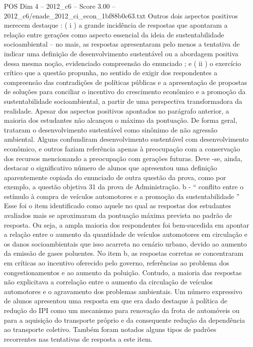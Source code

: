 \begin{textsample}{POS Dim 4 – 2012\_c6 – Score 3.00 – 2012\_c6/enade\_2012\_ci\_econ\_1bf88b0c63.txt}
Outros dois aspectos positivos merecem destaque : ( i ) a grande incidência de respostas que apontaram a relação entre gerações como aspecto essencial da ideia de sustentabilidade socioambiental – no mais, as respostas apresentaram pelo menos a tentativa de indicar uma definição de desenvolvimento sustentável ou a abordagem positiva dessa mesma noção, evidenciado compreensão do enunciado ; e ( ii ) o exercício crítico que a questão propunha, no sentido de exigir dos respondentes a compreensão das contradições de políticas públicas e a apresentação de propostas de soluções para conciliar o incentivo do crescimento econômico e a promoção da sustentabilidade socioambiental, a partir de uma perspectiva transformadora da realidade.
Apesar dos aspectos positivos apontados no parágrafo anterior, a maioria dos estudantes não alcançou o máximo da pontuação.
De forma geral, trataram o desenvolvimento sustentável como sinônimo de não agressão ambiental.
Alguns confundiram desenvolvimento sustentável com desenvolvimento econômico, e outros faziam referência apenas à preocupação com a conservação dos recursos mencionando a preocupação com gerações futuras.
Deve -se, ainda, destacar o significativo número de alunos que apresentou uma definição aparentemente copiada do enunciado de outra questão da prova, como por exemplo, a questão objetiva 31 da prova de Administração. b - “ conflito entre o estímulo à compra de veículos automotores e a promoção da sustentabilidade ” Esse foi o item identificado como aquele no qual as respostas dos estudantes avaliados mais se aproximaram da pontuação máxima prevista no padrão de resposta.
Ou seja, a ampla maioria dos respondentes foi bem-sucedida em apontar a relação entre o aumento da quantidade de veículos automotores em circulação e os danos socioambientais que isso acarreta no cenário urbano, devido ao aumento da emissão de gases poluentes.
No item b, as respostas corretas se concentraram em críticas ao incentivo oferecido pelo governo, referências ao problema dos congestionamentos e ao aumento da poluição.
Contudo, a maioria das respostas não explicitava a correlação entre o aumento da circulação de veículos automotores e o agravamento dos problemas ambientais.
Um número expressivo de alunos apresentou uma resposta em que era dado destaque à política de redução do IPI como um mecanismo para renovação da frota de automóveis ou para a aquisição do transporte próprio e da consequente redução da dependência ao transporte coletivo.
Também foram notados alguns tipos de padrões recorrentes nas tentativas de resposta a este item.

\end{textsample}
